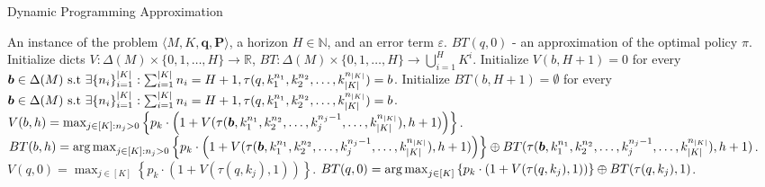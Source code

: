 \begin{algorithm}
   \caption{Dynamic Programming Approximation \label{alg:backward-induction-approximation}}
   \begin{algorithmic}[1]
     \REQUIRE An instance of the problem $\langle M, K, \bm{q}, \bm{P} \rangle$, a horizon $H \in \mathbb{N}$, and an error term $\varepsilon$.
     \ENSURE $BT(q, 0)$ - an approximation of the optimal policy $\pi$.
     \STATE Initialize dicts $V: \Delta(M) \times \{0, 1, \ldots, H\} \to \mathbb{R}$, $BT: \Delta(M) \times \{0, 1, \ldots, H\} \to \bigcup_{i=1}^{H} K^i$.
     \STATE Initialize $V(b, H+1) = 0$ for every $\bm{b} \in \Delta(M) \text{ s.t } \exists \{ n_i \}_{i=1}^{\lvert K\rvert}: \sum_{i=1}^{\lvert K\rvert} n_i = H+1, \tau(q, k_1^{n_1}, k_2^{n_2}, \ldots, k_{\lvert K\rvert}^{n_{\lvert K\rvert}}) = b$.
     \STATE Initialize $BT(b, H+1) = \emptyset$ for every $\bm{b} \in \Delta(M) \text{ s.t } \exists \{ n_i \}_{i=1}^{\lvert K\rvert}: \sum_{i=1}^{\lvert K\rvert} n_i = H+1, \tau(q, k_1^{n_1}, k_2^{n_2}, \ldots, k_{\lvert K\rvert}^{n_{\lvert K\rvert}}) = b$.
     \STATE $V(b, h) = \max_{j \in [K]: n_j > 0} \left\{ p_k \cdot \left( 1 + V(\tau(\bm{b}, k_1^{n_1}, k_2^{n_2}, \ldots, k_j^{n_j-1}, \ldots, k_{\lvert K\rvert}^{n_{\lvert K\rvert}}), h+1) \right) \right\}$.
     \STATE $BT(b, h) = \operatorname*{arg\,max}_{j \in [K]: n_j > 0} \left\{ p_k \cdot \left( 1 + V(\tau(\bm{b}, k_1^{n_1}, k_2^{n_2}, \ldots, k_j^{n_j-1}, \ldots, k_{\lvert K\rvert}^{n_{\lvert K\rvert}}), h+1) \right) \right\} \oplus BT(\tau(\bm{b}, k_1^{n_1}, k_2^{n_2}, \ldots, k_j^{n_j-1}, \ldots, k_{\lvert K\rvert}^{n_{\lvert K\rvert}}), h+1)$.
     \ENDFOR
     \ENDFOR
     \STATE $V(q, 0) = \max_{j \in [K]} \left\{ p_k \cdot \left( 1 + V(\tau(q, k_j), 1) \right) \right\}$.
     \STATE $BT(q, 0) = \operatorname*{arg\,max}_{j \in [K]} \left\{ p_k \cdot \left( 1 + V(\tau(q, k_j), 1) \right) \right\} \oplus BT(\tau(q, k_j), 1)$.
   \end{algorithmic}
\end{algorithm}
  
